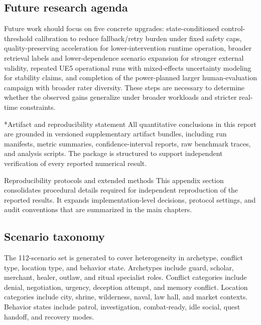 ﻿\documentclass[a4paper,12pt]{article}
\makeatletter
\renewcommand{\thesection}{\arabic{section}}
\let\origsection\section
\renewcommand{\section}{%
  \@ifstar{\origsection*}{%
    \ifnum\value{section}>0
      \clearpage
      \thispagestyle{empty}\null\clearpage
    \else
      \clearpage
    \fi
    \origsection}%
}
\makeatother
\begin{document}
\subsection{Future research agenda}
Future work should focus on five concrete upgrades: state-conditioned control-threshold calibration to reduce fallback/retry burden under fixed safety caps, quality-preserving acceleration for lower-intervention runtime operation, broader retrieval labels and lower-dependence scenario expansion for stronger external validity, repeated UE5 operational runs with mixed-effects uncertainty modeling for stability claims, and completion of the power-planned larger human-evaluation campaign with broader rater diversity. These steps are necessary to determine whether the observed gains generalize under broader workloads and stricter real-time constraints.

\section*{Artifact and reproducibility statement}
All quantitative conclusions in this report are grounded in versioned supplementary artifact bundles, including run manifests, metric summaries, confidence-interval reports, raw benchmark traces, and analysis scripts. The package is structured to support independent verification of every reported numerical result.

\appendix
\titleformat{\section}{\bfseries\fontsize{15}{20}\selectfont}{Appendix \thesection:}{0.6em}{}

\section{Reproducibility protocols and extended methods}
This appendix section consolidates procedural details required for independent reproduction of the reported results. It expands implementation-level decisions, protocol settings, and audit conventions that are summarized in the main chapters.
\subsection{Scenario taxonomy}
The 112-scenario set is generated to cover heterogeneity in archetype, conflict type, location type, and behavior state. Archetypes include guard, scholar, merchant, healer, outlaw, and ritual specialist roles. Conflict categories include denial, negotiation, urgency, deception attempt, and memory conflict. Location categories include city, shrine, wilderness, naval, law hall, and market contexts. Behavior states include patrol, investigation, combat-ready, idle social, quest handoff, and recovery modes.
\end{document}
